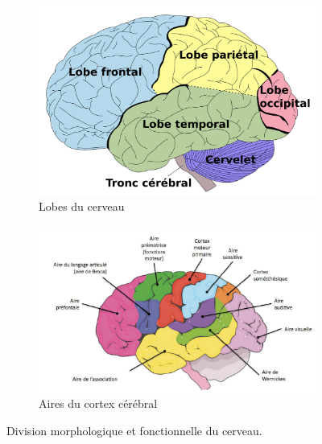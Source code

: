 \begin{figure}[htb]
    \begin{center}
        \begin{subfigure}{.38\linewidth}
            \includegraphics[width=\linewidth]{assets/pdf/lobes.pdf}
            \caption{Lobes du cerveau~\cite{Art_2013}}
            \label{fig.lobes}
        \end{subfigure}
        \begin{subfigure}{.52\linewidth}
            \includegraphics[width=\linewidth]{assets/images/areas.png}
            \caption{Aires du cortex cérébral~\cite{JDifool_2006}}
            \label{fig.brain-areas}
        \end{subfigure}       
    \end{center}
    \caption{Division morphologique et fonctionnelle du cerveau.}
\end{figure}




